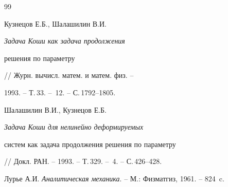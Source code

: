 \begin{thebibliography}{99}


Кузнецов Е.Б., Шалашилин В.И. {\em Задача Коши как задача продолжения


решения по параметру} // Журн. вычисл. матем. и матем. физ. --


1993. -- Т.\,33. -- \No\,12. -- С.\,1792--1805.




Шалашилин В.И., Кузнецов Е.Б. {\em Задача Коши для нелинейно деформируемых


систем как задача продолжения решения по параметру}


// Докл. РАН. -- 1993. -- Т.\,329. -- \No\,4. -- С.\,426--428.




Лурье А.И. {\em Аналитическая механика}. -- М.: Физматгиз, 1961. -- 824~c.





\end{thebibliography}





\vskip 2cm














\label{end}





